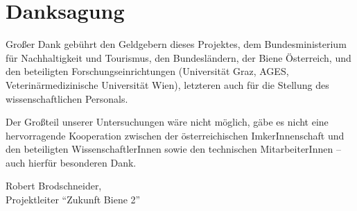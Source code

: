 {}
\section*{Danksagung}

Großer Dank gebührt den Geldgebern dieses Projektes, dem Bundesministerium für Nachhaltigkeit und Tourismus, den Bundesländern, der Biene Österreich, und den beteiligten Forschungseinrichtungen (Universität Graz, AGES, Veterinärmedizinische Universität Wien), letzteren auch für die Stellung des wissenschaftlichen Personals.

Der Großteil unserer Untersuchungen wäre nicht möglich, gäbe es nicht eine hervorragende Kooperation zwischen der österreichischen ImkerInnenschaft und den beteiligten WissenschaftlerInnen sowie den technischen MitarbeiterInnen – auch hierfür besonderen Dank.

\begin{flushright}
    Robert Brodschneider, \\
    Projektleiter \enquote{Zukunft Biene 2}
\end{flushright}